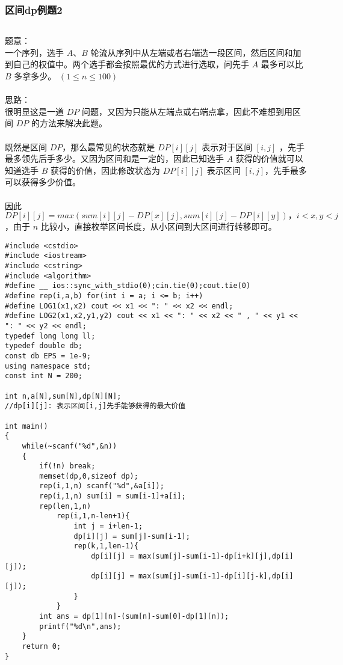 \documentclass[twoside]{article}
\begin{document}
\subsubsection{区间dp例题2}
\begin{lstlisting}
\end{lstlisting}
题意：\\
一个序列，选手 $A$、$B$ 轮流从序列中从左端或者右端选一段区间，然后区间和加到自己的权值中。两个选手都会按照最优的方式进行选取，问先手 $A$ 最多可以比 $B$ 多拿多少。 $(1\leq n\leq 100)$\\
\\
思路：\\
很明显这是一道 $DP$ 问题，又因为只能从左端点或右端点拿，因此不难想到用区间 $DP$ 的方法来解决此题。\\
\\
既然是区间 $DP$，那么最常见的状态就是 $DP[i][j]$ 表示对于区间 $[i,j]$ ，先手最多领先后手多少。又因为区间和是一定的，因此已知选手 $A$ 获得的价值就可以知道选手 $B$ 获得的价值，因此修改状态为 $DP[i][j]$ 表示区间 $[i,j]$，先手最多可以获得多少价值。\\
\\
因此 $DP[i][j] = max(sum[i][j]-DP[x][j],sum[i][j]-DP[i][y])，i < x,y < j$，由于 $n$ 比较小，直接枚举区间长度，从小区间到大区间进行转移即可。\\
\begin{lstlisting}
#include <cstdio>
#include <iostream>
#include <cstring>
#include <algorithm>
#define __ ios::sync_with_stdio(0);cin.tie(0);cout.tie(0)
#define rep(i,a,b) for(int i = a; i <= b; i++)
#define LOG1(x1,x2) cout << x1 << ": " << x2 << endl;
#define LOG2(x1,x2,y1,y2) cout << x1 << ": " << x2 << " , " << y1 << ": " << y2 << endl;
typedef long long ll;
typedef double db;
const db EPS = 1e-9;
using namespace std;
const int N = 200;

int n,a[N],sum[N],dp[N][N];
//dp[i][j]: 表示区间[i,j]先手能够获得的最大价值

int main()
{
	while(~scanf("%d",&n))
	{
		if(!n) break;
		memset(dp,0,sizeof dp);
		rep(i,1,n) scanf("%d",&a[i]);
		rep(i,1,n) sum[i] = sum[i-1]+a[i];
		rep(len,1,n)
			rep(i,1,n-len+1){
				int j = i+len-1;
				dp[i][j] = sum[j]-sum[i-1];
				rep(k,1,len-1){
					dp[i][j] = max(sum[j]-sum[i-1]-dp[i+k][j],dp[i][j]);
					dp[i][j] = max(sum[j]-sum[i-1]-dp[i][j-k],dp[i][j]);
				} 
			}
		int ans = dp[1][n]-(sum[n]-sum[0]-dp[1][n]);
		printf("%d\n",ans);
	}
	return 0;
}
\end{lstlisting}
\end{document}
